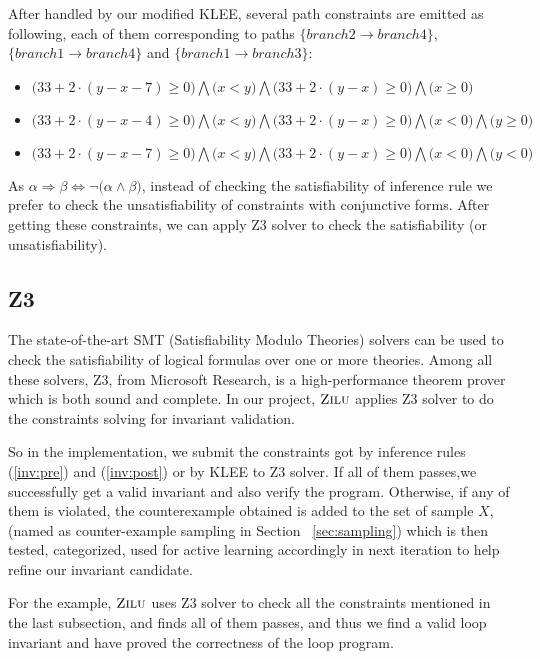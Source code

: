 After handled by our modified KLEE,
several path constraints are emitted as following, each of them corresponding to paths 
$\{branch2 \to branch4\}$, $\{branch1 \to branch4\}$ and $\{branch1 \to branch3\}$:


\begin{itemize}
\item $\big(33+2\cdot(y-x-7)\ge0\big) \bigwedge \big(x<y\big) \bigwedge \big(33+2\cdot(y-x)\ge0\big) \bigwedge \big(x\ge0\big)$
\item $\big(33+2\cdot(y-x-4)\ge0\big) \bigwedge \big(x<y\big) \bigwedge \big(33+2\cdot(y-x)\ge0\big) \bigwedge \big(x<0\big) \bigwedge \big(y\ge0\big)$
\item $\big(33+2\cdot(y-x-7)\ge0\big) \bigwedge \big(x<y\big) \bigwedge \big(33+2\cdot(y-x)\ge0\big) \bigwedge \big(x<0\big) \bigwedge \big(y<0\big)$
\end{itemize}
As $\alpha \Rightarrow \beta \Longleftrightarrow \neg \big(\alpha \wedge \beta\big)$, 
instead of checking the satisfiability of inference rule
we prefer to check the unsatisfiability of constraints with conjunctive forms. 
After getting these constraints, we can apply Z3\cite{de2008z3} solver to check the satisfiability (or unsatisfiability).

\subsection{Z3}
\label{subsec:z3}
The state-of-the-art SMT (Satisfiability Modulo Theories)\cite{barrett2009satisfiability}  solvers can be used to 
check the satisfiability of logical formulas over one or more theories. 
Among all these solvers, Z3\cite{de2008z3}, from Microsoft Research, is a high-performance theorem prover which is both sound and complete.
In our project, $\textsc{Zilu}$ applies Z3 solver to do the constraints solving for invariant validation. 

So in the implementation, we submit the constraints got by inference rules (\ref{inv:pre}) and (\ref{inv:post}) or by KLEE to Z3 solver.
If all of them passes,we successfully get a valid invariant and also verify the program. 
Otherwise, if any of them is violated, the counterexample obtained is added to the set of sample $X$, 
(named as counter-example sampling in Section ~\ref{sec:sampling})
which is then tested, categorized, used for active learning accordingly in next iteration to help refine our invariant candidate.

For the example, $\textsc{Zilu}$ uses Z3 solver to check all the constraints mentioned in the last subsection,
and finds all of them passes, and thus we find a valid loop invariant and have proved the correctness of the loop program.

